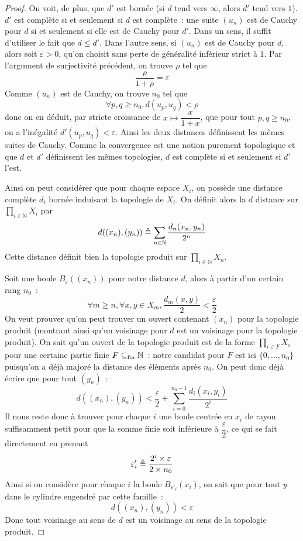 \begin{proof}
  On voit, de plus, que $d'$ est bornée (si $d$ tend vers $\infty$, alors $d'$
  tend vers $1$). $d'$ est complète si et seulement si $d$ est complète~:
  une suite $(u_n)$ est de Cauchy pour $d$ si et seulement si elle est de
  Cauchy pour $d'$. Dans un sens, il suffit d'utiliser le fait que
  $d \leq d'$. Dans l'autre sens, si $(u_n)$ est de Cauchy pour
  $d$, alors soit $\varepsilon > 0$, qu'on choisit sans perte de généralité
  inférieur strict à $1$. Par l'argument de surjectivité précédent, on trouve
  $\rho$ tel que
  \[\frac{\rho}{1 + \rho} = \varepsilon\]
  Comme $(u_n)$ est de Cauchy, on trouve $n_0$ tel que
  \[\forall p,q \geq n_0, d(u_p,u_q) < \rho\]
  donc on en déduit, par stricte croissance de $x\mapsto \dfrac{x}{1 + x}$,
  que pour tout $p,q \geq n_0$, on a l'inégalité $d'(u_p,u_q) < \varepsilon$.
  Ainsi les deux distances définissent les mêmes suites de Cauchy. Comme la
  convergence est une notion purement topologique et que $d$ et $d'$
  définissent les mêmes topologies, $d$ est complète si et seulement si $d'$
  l'est.

  Ainsi on peut considérer que pour chaque espace $X_i$, on possède une
  distance complète $d_i$ bornée induisant la topologie de $X_i$. On définit
  alors la $d$ distance sur $\displaystyle\prod_{i\in\mathbb N} X_i$ par
  \[d((x_n),(y_n)) \triangleq \sum_{n \in \mathbb N} \frac{d_n(x_n,y_n)}{2^n}\]
  Cette distance définit bien la topologie produit sur
  $\displaystyle\prod_{i\in\mathbb N} X_n$.

  Soit une boule $B_\varepsilon((x_n))$ pour notre distance $d$, alors à partir
  d'un certain rang $n_0$~:
  \[\forall m \geq n, \forall x,y \in X_m,
  \frac{d_m(x,y)}{2} < \frac{\varepsilon}{2}\]
  On veut prouver qu'on peut trouver un ouvert contenant $(x_n)$ pour la
  topologie produit (montrant ainsi qu'un voisinage pour $d$ est un voisinage
  pour la topologie produit). On sait qu'un ouvert de la topologie produit
  est de la forme $\displaystyle\prod_{i \in F} X_i$ pour une certaine partie
  finie $F\subseteq_{\mathrm{fin}} \mathbb N$~: notre candidat pour $F$ est ici
  $\{0,\ldots,n_0\}$ puisqu'on a déjà majoré la distance des éléments après
  $n_0$. On peut donc déjà écrire que pour tout $(y_n)$~:
  \[d((x_n),(y_n)) < \frac{\varepsilon}{2} +
  \sum_{i = 0}^{n_0 - 1} \frac{d_i(x_i,y_i)}{2^i}\]
  Il nous reste donc à trouver pour chaque $i$ une boule centrée en
  $x_i$ de rayon suffisamment petit pour que la somme finie soit inférieure à
  $\dfrac{\varepsilon}{2}$, ce qui se fait directement en prenant
  \[\varepsilon'_i \triangleq \frac{2^i\times \varepsilon}{2 \times n_0}\]
  Ainsi si on considère pour chaque $i$ la boule $B_{\varepsilon'_i}(x_i)$, on
  sait que pour tout $y$ dans le cylindre engendré par cette famille~:
  \[d((x_n),(y_n)) < \varepsilon\]
  Donc tout voisinage au sens de $d$ est un voisinage au sens de la topologie
  produit.


\end{proof}
